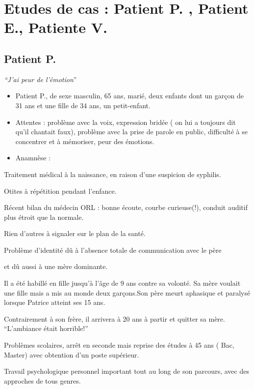 \documentclass[12pt,french]{report}
\begin{document}
\chapter{Etudes de cas : Patient P. , Patient E., Patiente V.}

\section{Patient P.}

\emph{``J'ai peur de l'émotion}''
\begin{itemize}
\item Patient P., de sexe masculin, 65 ans, marié, deux enfants dont un
garçon de 31 ans et une fille de 34 ans, un petit-enfant.
\item Attentes : problème avec la voix, expression bridée ( on lui a toujours
dit qu'il chantait faux), problème avec la prise de parole en public,
difficulté à se concentrer et à mémoriser, peur des émotions.
\item Anamnèse :
\end{itemize}
Traitement médical à la naissance, en raison d'une suspicion de syphilis.

Otites à répétition pendant l'enfance.

Récent bilan du médecin ORL : bonne écoute, courbe curieuse(!), conduit
auditif plus étroit que la normale.

Rien d'autres à signaler sur le plan de la santé.

Problème d'identité dû à l'absence totale de communication avec le
père 

et dû aussi à une mère dominante.

Il a été habillé en fille jusqu'à l'âge de 9 ans contre sa volonté.
Sa mère voulait une fille mais a mis au monde deux garçons.Son père
meurt aphasique et paralysé lorsque Patrice atteint ses 15 ans.

Contrairement à son frère, il arrivera à 20 ans à partir et quitter
sa mère. ``L'ambiance était horrible!''

Problèmes scolaires, arrêt en seconde mais reprise des études à 45
ans ( Bac, Master) avec obtention d'un poste supérieur.

Travail psychologique personnel important tout au long de son parcours,
avec des approches de tous genres.
\end{document}
